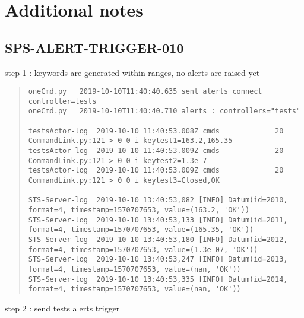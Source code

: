 \section{Additional notes}

\subsection{SPS-ALERT-TRIGGER-010}
\label{sec:tc-010}

step 1 : keywords are generated within ranges, no alerts are raised yet
\begin{quote}
\begin{tiny}
\begin{verbatim}
oneCmd.py   2019-10-10T11:40:40.635 sent alerts connect controller=tests
oneCmd.py   2019-10-10T11:40:40.710 alerts : controllers="tests"

testsActor-log  2019-10-10 11:40:53.008Z cmds             20 CommandLink.py:121 > 0 0 i keytest1=163.2,165.35
testsActor-log  2019-10-10 11:40:53.009Z cmds             20 CommandLink.py:121 > 0 0 i keytest2=1.3e-7
testsActor-log  2019-10-10 11:40:53.009Z cmds             20 CommandLink.py:121 > 0 0 i keytest3=Closed,OK

STS-Server-log  2019-10-10 13:40:53,082 [INFO] Datum(id=2010, format=4, timestamp=1570707653, value=(163.2, 'OK'))
STS-Server-log  2019-10-10 13:40:53,133 [INFO] Datum(id=2011, format=4, timestamp=1570707653, value=(165.35, 'OK'))
STS-Server-log  2019-10-10 13:40:53,180 [INFO] Datum(id=2012, format=4, timestamp=1570707653, value=(1.3e-07, 'OK'))
STS-Server-log  2019-10-10 13:40:53,247 [INFO] Datum(id=2013, format=4, timestamp=1570707653, value=(nan, 'OK'))
STS-Server-log  2019-10-10 13:40:53,335 [INFO] Datum(id=2014, format=4, timestamp=1570707653, value=(nan, 'OK'))
\end{verbatim}
\end{tiny}
\end{quote}

\noindent step 2 : send tests alerts trigger

